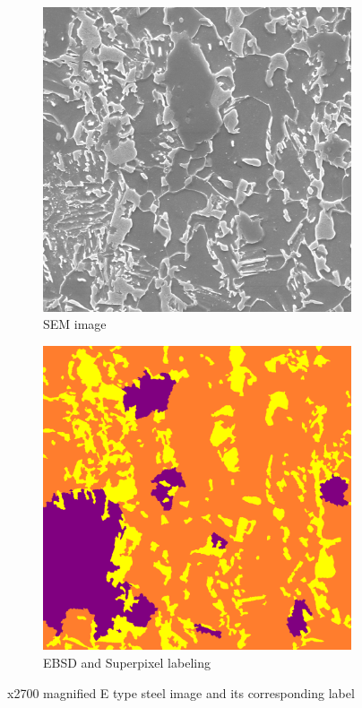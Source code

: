 \documentclass[]{article}
\begin{document}
\begin{figure}[ht]
	\centering
	\begin{subfigure}[b]{0.45\textwidth}
		\centering
		\includegraphics[width=\textwidth]{images/1.png}
		\caption{SEM image}
		\label{fig:image1}
	\end{subfigure}
	\hfill
	\begin{subfigure}[b]{0.45\textwidth}
		\centering
		\includegraphics[width=\textwidth]{images/1_label.png}
		\caption{EBSD and Superpixel labeling }
		\label{fig:image2}
	\end{subfigure}
	\caption{x2700 magnified E type steel image and its corresponding label}
	\label{fig:combined}
\end{figure}
\end{document}
